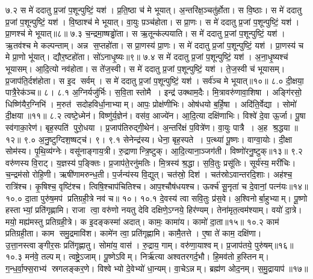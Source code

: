 ७.२
स मे॑ ददातु प्र॒जां प॒शून्पुष्टिं॒ यश॑। प्र॒ति॒ष्ठा च॑ मे भूयात्। अ॒न्तरि॑क्ष॒ञ्चतु॑र्\mbox{}होता। स वि॒ष्ठाः। स मे॑ ददातु प्र॒जां प॒शून्पुष्टिं॒ यश॑। वि॒ष्ठाश्च॑ मे भूयात्। वा॒युः प़ञ्च॑होता। स प्रा॒णः। स मे॑ ददातु प्र॒जां प॒शून्पुष्टिं॒ यश॑। प्रा॒णश्च॑ मे भूयात्॥८॥
७.३
च॒न्द्रमा॒ष्षड्ढो॑ता। स ऋ॒तून्क॑ल्पयाति। स मे॑ ददातु प्र॒जां प॒शून्पुष्टिं॒ यश॑। ऋ॒तव॑श्च मे कल्पन्ताम्। अन्न स॒प्तहो॑ता। स प्रा॒णस्य॑ प्रा॒णः। स मे॑ ददातु प्र॒जां प॒शून्पुष्टिं॒ यश॑। प्रा॒णस्य॑ च मे प्रा॒णो भू॑यात्। द्यौर॒ष्टहो॑ता। सो॑ऽनाधृ॒ष्यः॥९॥%
७.४
स मे॑ ददातु प्र॒जां प॒शून्पुष्टिं॒ यश॑। अ॒ना॒धृ॒ष्यश्च॑ भूयासम्। आ॒दि॒त्यो नव॑होता। स ते॑ज॒स्वी। स मे॑ ददातु प्र॒जां प॒शून्पुष्टिं॒ यश॑। ते॒ज॒स्वी च॑ भूयासम्। प्र॒जाप॑ति॒र्दश॑होता। स इ॒द सर्वम्। स मे॑ ददातु प्र॒जां प॒शून्पुष्टिं॒ यश॑। सर्व॑ञ्च मे भूयात्॥१०॥%
८.०
दी॒क्षया॒ पात्रै॒रेक॑ञ्च॥ ८।
\anuvakamend
८.१
अ॒ग्निर्यजु॑र्भिः। स॒वि॒ता स्तोमै। इन्द्र॑ उक्थाम॒दैः। मि॒त्रावरु॑णावा॒शिषा। अङ्गि॑रसो॒ धिष्णि॑यैर॒ग्निभि॑। म॒रुत॑ सदोहविर्धा॒नाभ्याम्। आपः॒ प्रोक्ष॑णीभिः। ओष॑धयो ब॒र्\mbox{}हि॒षा। अदि॑ति॒र्वेद्या। सोमो॑ दी॒क्षया॥११॥
८.२
त्वष्टे॒ध्मेन॑। विष्णु॑र्य॒ज्ञेन॑। वस॑व॒ आज्ये॑न। आ॒दि॒त्या दक्षि॑णाभिः। विश्वे॑ दे॒वा ऊ॒र्जा। पू॒षा स्व॑गाका॒रेण॑। बृह॒स्पति॑ पुरो॒धया। प्र॒जाप॑तिरुद्गी॒थेन॑। अ॒न्तरि॑क्षं प॒वित्रे॑ण। वा॒युः पात्रै। अ॒ह श्र॒द्धया॥१२॥
९.०
अ॒नु॒ष्टुग्दिश॒ष्षट्च॑। ९।
\anuvakamend
९.१
सेनेन्द्र॑स्य। धेना॒ बृह॒स्पते। प॒त्थ्या॑ पू॒ष्णः। वाग्वा॒योः। दी॒क्षा सोम॑स्य। पृ॒थि॒व्य॑ग्नेः। वसू॑नाङ्गाय॒त्री। रु॒द्राणान्त्रि॒ष्टुक्। आ॒दि॒त्याना॒ञ्जग॑ती। विष्णो॑रनु॒ष्टुक्॥१३॥%
९.२
वरु॑णस्य वि॒राट्। य॒ज्ञस्य॑ प॒ङ्क्तिः। प्र॒जाप॑ते॒रनु॑मतिः। मि॒त्रस्य॑ श्र॒द्धा। स॒वि॒तुः प्रसू॑तिः। सूर्य॑स्य॒ मरी॑चिः। च॒न्द्रम॑सो रोहि॒णी। ऋषी॑णामरुन्ध॒ती। प॒र्जन्य॑स्य वि॒द्युत्। चत॑स्रो॒ दिश॑। चत॑स्रोऽवान्तरदि॒शाः। अह॑श्च॒ रात्रि॑श्च। कृ॒षिश्च॒ वृष्टि॑श्च। त्विषि॒श्चाप॑चितिश्च। आप॒श्चौष॑धयश्च। ऊर्क्च॑ सू॒नृता॑ च दे॒वानां॒ पत्न॑यः॥१४॥%
१०.०
दा॒ता पुरु॑ष॒मप॑ प्रतिग्रही॒त्रे नव॑ च॥ १०।
\anuvakamend
१०.१
दे॒वस्य॑ त्वा सवि॒तुः प्र॑स॒वे। अ॒श्विनोर्बा॒हुभ्याम्। पू॒ष्णो हस्ताभ्यां॒ प्रति॑गृह्णामि। राजा त्वा॒ वरु॑णो नयतु देवि दक्षिणे॒ऽग्नये॒ हिर॑ण्यम्। तेना॑मृत॒त्वम॑श्याम्। वयो॑ दा॒त्रे। मयो॒ मह्य॑मस्तु प्रतिग्रही॒त्रे। क इ॒दङ्कस्मा॑ अदात्। कामः॒ कामा॑य। कामो॑ दा॒ता॥१५॥
१०.२
काम॑ प्रतिग्रही॒ता। काम समु॒द्रमावि॑श। कामे॑न त्वा॒ प्रति॑गृह्णामि। कामै॒तत्ते। ए॒षा ते॑ काम॒ दक्षि॑णा। उ॒त्ता॒नस्त्वाङ्गीर॒सः प्रति॑गृह्णातु। सोमा॑य॒ वास॑। रु॒द्राय॒ गाम्। वरु॑णा॒याश्वम्। प्र॒जाप॑तये॒ पुरु॑षम्॥१६॥%
१०.३
मन॑वे॒ तल्पम्। त्वष्ट्रे॒ऽजाम्। पू॒ष्णेऽविम्। निर्\mbox{}ऋ॑त्या अश्वतरगर्द॒भौ। हि॒मव॑तो ह॒स्तिनम्। ग॒न्ध॒र्वा॒फ्स॒राभ्य॑ स्रगलङ्कर॒णे। विश्वेभ्यो दे॒वेभ्यो॑ धा॒न्यम्। वा॒चेऽन्नम्। ब्रह्म॑ण ओद॒नम्। स॒मु॒द्रायाप॑॥१७॥
